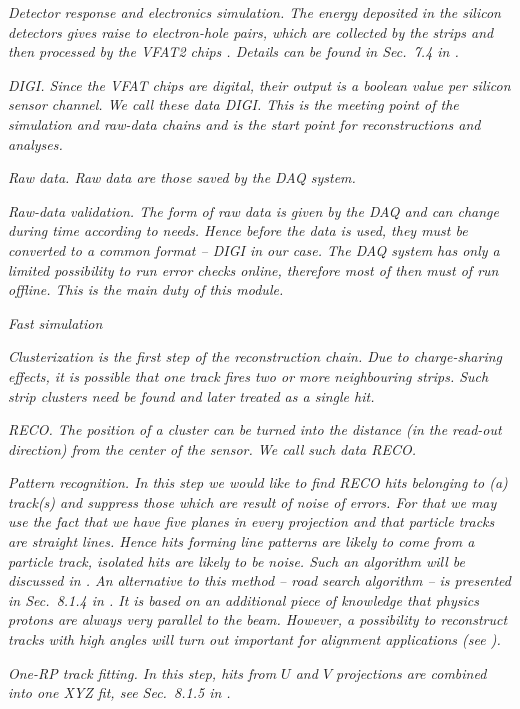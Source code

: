 \em{Detector response and electronics simulation}. The energy deposited in the silicon detectors gives raise to electron-hole pairs, which are collected by the strips and then processed by the VFAT2 chips . Details can be found in Sec.~7.4 in .

\em{DIGI}.
Since the VFAT chips are digital, their output is a boolean value per silicon sensor channel. We call these data DIGI. This is the meeting point of the simulation and raw-data chains and is the start point for reconstructions and analyses.

\em{Raw data}.
Raw data are those saved by the DAQ system.

\em{Raw-data validation}.
The form of raw data is given by the DAQ and can change during time according to needs. Hence before the data is used, they must be converted to a common format -- DIGI in our case. The DAQ system has only a limited possibility to run error checks online, therefore most of then must of run offline. This is the main duty of this module.

\em{Fast simulation}


\em{Clusterization}
is the first step of the reconstruction chain. Due to charge-sharing effects, it is possible that one track fires two or more neighbouring strips. Such strip clusters need be found and later treated as a single hit.

\em{RECO}.
The position of a cluster can be turned into the distance (in the read-out direction) from the center of the sensor. We call such data RECO.


\em{Pattern recognition}.
In this step we would like to find RECO hits belonging to (a) track(s) and suppress those which are result of noise of errors. For that we may use the fact that we have five planes in every projection and that particle tracks are straight lines. Hence hits forming line patterns are likely to come from a particle track, isolated hits are likely to be noise. Such an algorithm will be discussed in . An alternative to this method -- road search algorithm -- is presented in Sec.~8.1.4 in . It is based on an additional piece of knowledge that physics protons are always very parallel to the beam. However, a possibility to reconstruct tracks with high angles will turn out important for alignment applications (see ). 

\em{One-RP track fitting}.
In this step, hits from $U$ and $V$ projections are combined into one XYZ fit, see Sec.~8.1.5 in .

